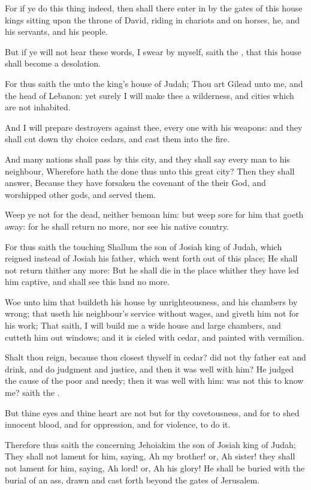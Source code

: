 \verse For if ye do this thing indeed, then shall there enter in by the gates of this house kings sitting upon the throne of David, riding in chariots and on horses, he, and his servants, and his people.

\verse But if ye will not hear these words, I swear by myself, saith the \LORD, that this house shall become a desolation.

\verse For thus saith the \LORD unto the king's house of Judah; Thou art Gilead unto me, and the head of Lebanon: yet surely I will make thee a wilderness, and cities which are not inhabited.

\verse And I will prepare destroyers against thee, every one with his weapons: and they shall cut down thy choice cedars, and cast them into the fire.

\verse And many nations shall pass by this city, and they shall say every man to his neighbour, Wherefore hath the \LORD done thus unto this great city?  \verse Then they shall answer, Because they have forsaken the covenant of the \LORD their God, and worshipped other gods, and served them.

\verse Weep ye not for the dead, neither bemoan him: but weep sore for him that goeth away: for he shall return no more, nor see his native country.

\verse For thus saith the \LORD touching Shallum the son of Josiah king of Judah, which reigned instead of Josiah his father, which went forth out of this place; He shall not return thither any more: \verse But he shall die in the place whither they have led him captive, and shall see this land no more.

\verse Woe unto him that buildeth his house by unrighteousness, and his chambers by wrong; that useth his neighbour's service without wages, and giveth him not for his work; \verse That saith, I will build me a wide house and large chambers, and cutteth him out windows; and it is cieled with cedar, and painted with vermilion.

\verse Shalt thou reign, because thou closest thyself in cedar? did not thy father eat and drink, and do judgment and justice, and then it was well with him?  \verse He judged the cause of the poor and needy; then it was well with him: was not this to know me? saith the \LORD.

\verse But thine eyes and thine heart are not but for thy covetousness, and for to shed innocent blood, and for oppression, and for violence, to do it.

\verse Therefore thus saith the \LORD concerning Jehoiakim the son of Josiah king of Judah; They shall not lament for him, saying, Ah my brother! or, Ah sister! they shall not lament for him, saying, Ah lord! or, Ah his glory!  \verse He shall be buried with the burial of an ass, drawn and cast forth beyond the gates of Jerusalem.


